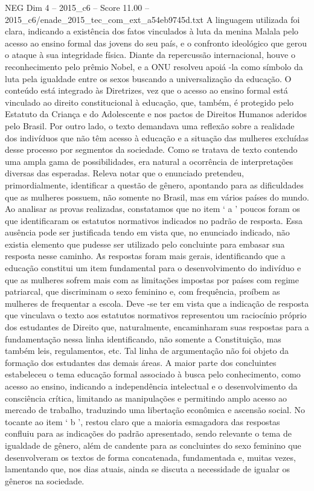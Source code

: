 \begin{textsample}{NEG Dim 4 – 2015\_c6 – Score 11.00 – 2015\_c6/enade\_2015\_tec\_com\_ext\_a54eb9745d.txt}
A linguagem utilizada foi clara, indicando a existência dos fatos vinculados à luta da menina Malala pelo acesso ao ensino formal das jovens do seu país, e o confronto ideológico que gerou o ataque à sua integridade física.
Diante da repercussão internacional, houve o reconhecimento pelo prêmio Nobel, e a ONU resolveu apoiá -la como símbolo da luta pela igualdade entre os sexos buscando a universalização da educação.
O conteúdo está integrado às Diretrizes, vez que o acesso ao ensino formal está vinculado ao direito constitucional à educação, que, também, é protegido pelo Estatuto da Criança e do Adolescente e nos pactos de Direitos Humanos aderidos pelo Brasil.
Por outro lado, o texto demandava uma reflexão sobre a realidade dos indivíduos que não têm acesso à educação e a situação das mulheres excluídas desse processo por segmentos da sociedade.
Como se tratava de texto contendo uma ampla gama de possibilidades, era natural a ocorrência de interpretações diversas das esperadas.
Releva notar que o enunciado pretendeu, primordialmente, identificar a questão de gênero, apontando para as dificuldades que as mulheres possuem, não somente no Brasil, mas em vários países do mundo.
Ao analisar as provas realizadas, constatamos que no item ‘ a ’ poucos foram os que identificaram os estatutos normativos indicados no padrão de resposta.
Essa ausência pode ser justificada tendo em vista que, no enunciado indicado, não existia elemento que pudesse ser utilizado pelo concluinte para embasar sua resposta nesse caminho.
As respostas foram mais gerais, identificando que a educação constitui um item fundamental para o desenvolvimento do indivíduo e que as mulheres sofrem mais com as limitações impostas por países com regime patriarcal, que discriminam o sexo feminino e, com frequência, proíbem as mulheres de frequentar a escola.
Deve -se ter em vista que a indicação de resposta que vinculava o texto aos estatutos normativos representou um raciocínio próprio dos estudantes de Direito que, naturalmente, encaminharam suas respostas para a fundamentação nessa linha identificando, não somente a Constituição, mas também leis, regulamentos, etc.
Tal linha de argumentação não foi objeto da formação dos estudantes das demais áreas.
A maior parte dos concluintes estabeleceu o tema educação formal associado à busca pelo conhecimento, como acesso ao ensino, indicando a independência intelectual e o desenvolvimento da consciência crítica, limitando as manipulações e permitindo amplo acesso ao mercado de trabalho, traduzindo uma libertação econômica e ascensão social.
No tocante ao item ‘ b ’, restou claro que a maioria esmagadora das respostas confluiu para as indicações do padrão apresentado, sendo relevante o tema de igualdade de gênero, além de candente para as concluintes do sexo feminino que desenvolveram os textos de forma concatenada, fundamentada e, muitas vezes, lamentando que, nos dias atuais, ainda se discuta a necessidade de igualar os gêneros na sociedade.

\end{textsample}
